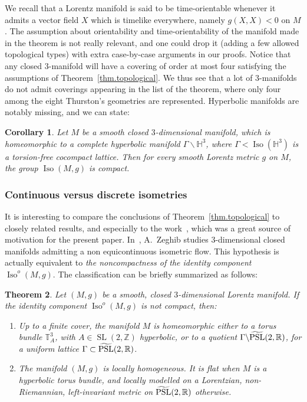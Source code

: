 \documentclass[11pt]{article}
\newtheorem{theo}{Theorem}[section]
\newtheorem{coro}[theo]{Corollary}
\theoremstyle{definition}
\numberwithin{equation}{section}
\numberwithin{figure}{section}
\numberwithin{table}{section}
\DeclareMathOperator{\Iso}{Iso}
\DeclareMathOperator{\PSL}{PSL}
\DeclareMathOperator{\SL}{SL}
\newcommand*\TT{\mathbb{T}}
\newcommand*\RR{\mathbb{R}}
\newcommand*\ZZ{\mathbb{Z}}
\let\oldtilde\tilde
\renewcommand*\tilde[1]{\mathchoice{\widetilde{#1}}{\widetilde{#1}}{\widetilde{#1}}{\oldtilde{#1}}}
\begin{document}
We recall that a Lorentz manifold is said to be time-orientable whenever it admits a vector field $X$ which is timelike everywhere, namely $g(X,X)<0$ on $M$. The assumption about orientability and time-orientability of the manifold made in the theorem is not really relevant, and one could drop it (adding a few allowed topological types) with extra case-by-case arguments in our proofs. Notice that any closed $3$-manifold will have a covering of order at most four satisfying the assumptions of Theorem~\ref{thm.topological}. We thus see that a lot of $3$-manifolds do not admit coverings appearing in the list of the theorem, where only four among the eight Thurston's geometries are represented. Hyperbolic manifolds are notably missing, and we can state:

\begin{coro}\label{coro.hyperbolicmanifold}
Let $M$ be a smooth closed $3$-dimensional manifold, which is homeo\-morphic to a complete hyperbolic manifold $\Gamma \backslash {\mathbb H}^3$, where $\Gamma<\Iso({\mathbb H}^3)$ is a torsion-free cocompact lattice. Then for every smooth Lorentz metric $g$ on $M$, the group $\Iso(M,g)$ is compact.
\end{coro}

\subsubsection{Continuous versus discrete isometries}

It is interesting to compare the conclusions of Theorem~\ref{thm.topological} to closely related results, and especially to the work~\cite{zeghibflot}, which was a great source of motivation for the present paper. In~\cite{zeghibflot}, A.~Zeghib studies $3$-dimensional closed manifolds admitting a non equicontinuous isometric flow. This hypothesis is actually equivalent to \emph{the noncompactness of the identity component $\Iso^o(M,g)$}. The classification can be briefly summarized as follows:


\begin{theo}\cite[Theorems~1 and 2]{zeghibflot}\label{thm.ghaniclassification}
Let $(M,g)$ be a smooth, closed $3$-dimensional Lorentz manifold. If the identity component $\Iso^o(M,g)$ is not compact, then:
\begin{enumerate}
\item \label{list1.3.1} Up to a finite cover, the manifold $M$ is homeomorphic either to a torus bundle $\TT_A^3$, with $A \in \SL(2,\ZZ)$ hyperbolic, or to a quotient $\Gamma \backslash \tilde{\PSL}(2,\RR)$, for a uniform lattice $\Gamma \subset \tilde{\PSL}(2,\RR)$.
\item \label{list1.3.2}The manifold $(M,g)$ is locally homogeneous. It is flat when $M$ is a hyperbolic torus bundle, and locally modelled on a Lorentzian, non-Riemannian, left-invariant metric on $\tilde{\PSL}(2,\RR)$ otherwise.
\end{enumerate}
\end{theo}
\end{document}
